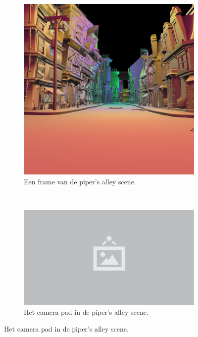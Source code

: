 \begin{figure}[p]
  \begin{subfigure}[b]{.95\linewidth}
    \centering\includegraphics[width=\textwidth]{./img/raw/test-suite-pipers-alley-frame.png}
    \caption{Een frame van de piper's alley scene.}\label{fig:test-suite-pipers-alley:frame}
  \end{subfigure}
  \\
  \begin{subfigure}[b]{.33\linewidth}
    \centering\includegraphics[width=\textwidth]{./img/raw/placeholder.png}
    \caption{Het camera pad in de piper's alley scene.}\label{fig:test-suite-pipers-alley:camera}

\end{subfigure}
\end{figure}
